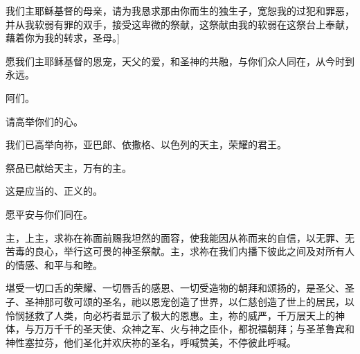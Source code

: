 \Emph{[司铎秘密地说以下祷词：——}\par

我们主耶稣基督的母亲，请为我恳求那由你而生的独生子，宽恕我的过犯和罪恶，并从我软弱有罪的双手，接受这卑微的祭献，这祭献由我的软弱在这祭台上奉献，藉着你为我的转求，圣母。]\par

\par

愿我们主耶稣基督的恩宠，天父的爱，和圣神的共融，与你们众人同在，从今时到永远。\par

\par

阿们。\par

\par

请高举你们的心。\par

\par

我们已高举向祢，亚巴郎、依撒格、以色列的天主，荣耀的君王。\par

\par

祭品已献给天主，万有的主。\par

\par

这是应当的、正义的。\par

\par

愿平安与你们同在。\par

\par

主，上主，求祢在祢面前赐我坦然的面容，使我能因从祢而来的自信，以无罪、无苦毒的良心，举行这可畏的神圣祭献。主，求祢在我们内播下彼此之间及对所有人的情感、和平与和睦。\par

\par

堪受一切口舌的荣耀、一切唇舌的感恩、一切受造物的朝拜和颂扬的，是圣父、圣子、圣神那可敬可颂的圣名，祂以恩宠创造了世界，以仁慈创造了世上的居民，以怜悯拯救了人类，向必朽者显示了极大的恩惠。主，祢的威严，千万层天上的神体，与万万千千的圣天使、众神之军、火与神之臣仆，都祝福朝拜；与圣革鲁宾和神性塞拉芬，他们圣化并欢庆祢的圣名，呼喊赞美，不停彼此呼喊。\par

